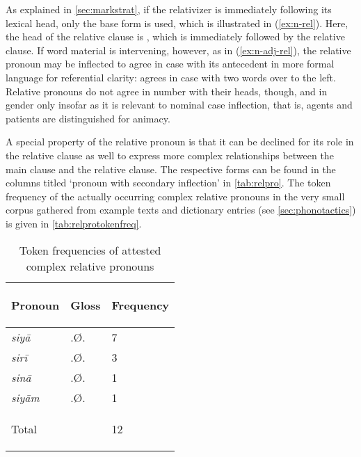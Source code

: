 As explained in \autoref{sec:markstrat}, if the relativizer is immediately 
following its lexical head, only the base form  is used, which is 
illustrated in (\ref{ex:n-rel}). Here, the head of the relative clause is
, which is immediately followed by the
relative clause. If word material is intervening, however, as in
(\ref{ex:n-adj-rel}), the relative pronoun may be inflected to agree in case
with its antecedent in more formal language for referential clarity:
 agrees in case with  two words over to the
left. Relative pronouns do not agree in number with their heads, though, and in
gender only insofar as it is relevant to nominal case inflection, that is,
agents and patients are distinguished for animacy.

A special property of the relative pronoun is that it can be declined for its 
role in the relative clause as well to express more complex relationships 
between the main clause and the relative clause. The respective forms can be 
found in the columns titled `pronoun with secondary inflection' in 
\autoref{tab:relpro}. The token frequency of the actually occurring complex 
relative pronouns in the very small corpus gathered from example texts and 
dictionary entries (see \autoref{sec:phonotactics}) is given in 
\autoref{tab:relprotokenfreq}.

\begin{table}[tp]\centering
\caption{Token frequencies of attested complex relative pronouns}

\begin{tabu} to .75
\tableheaderfont\toprule

Pronoun & Gloss & Frequency \\

\toprule

siyā	& \Rel{}.Ø.\Loc{} & 7 \\
sirī	& \Rel{}.Ø.\Ins{} & 3 \\
sinā	& \Rel{}.Ø.\Gen{} & 1 \\
siyām	& \Rel{}.Ø.\Dat{} & 1 \\

\bottomrule

\textup{Total}	& & 12 \\

\bottomrule
\end{tabu}
\label{tab:relprotokenfreq}
\end{table}

